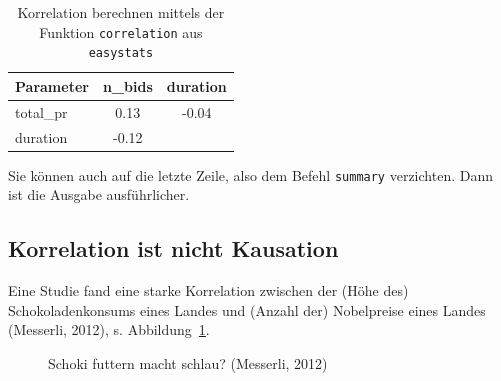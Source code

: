 \documentclass[
  letterpaper,
  twoside,
  open=any]{scrbook}
\theoremstyle{definition}
\theoremstyle{definition}
\theoremstyle{definition}
\theoremstyle{remark}
\begin{document}
\begin{longtable}[]{@{}lcc@{}}

\caption{\label{tbl-mario-corr1}Korrelation berechnen mittels der
Funktion \texttt{correlation} aus \texttt{easystats}}

\tabularnewline

\toprule\noalign{}
Parameter & n\_bids & duration \\
\midrule\noalign{}
\endhead
\bottomrule\noalign{}
\endlastfoot
total\_pr & 0.13 & -0.04 \\
duration & -0.12 & \\

\end{longtable}

Sie können auch auf die letzte Zeile, also dem Befehl \texttt{summary}
verzichten. Dann ist die Ausgabe ausführlicher.

\subsection{Korrelation ist nicht
Kausation}\label{korrelation-ist-nicht-kausation}

Eine Studie fand eine starke Korrelation zwischen der (Höhe des)
Schokoladenkonsums eines Landes und (Anzahl der) Nobelpreise eines
Landes (Messerli, 2012), s. Abbildung~\ref{fig-schoki}.

\begin{figure}


\caption{\label{fig-schoki}Schoki futtern macht schlau? (Messerli,
2012)}

\end{figure}%
\end{document}
